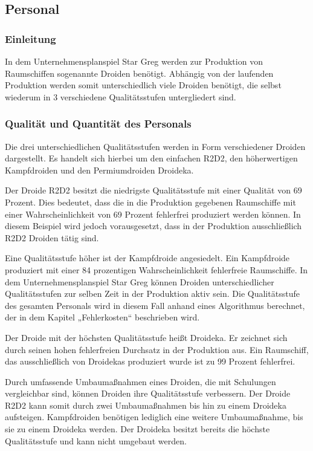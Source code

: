 \subsection{Personal}
\label{sub:Personal}
\subsubsection{Einleitung}
In dem Unternehmensplanspiel Star Greg werden zur Produktion von Raumschiffen sogenannte Droiden benötigt.   Abhängig von der laufenden Produktion  werden somit unterschiedlich viele Droiden benötigt, die selbst wiederum in 3 verschiedene Qualitätsstufen untergliedert sind.

\subsubsection{Qualität und Quantität des Personals}
Die drei unterschiedlichen Qualitätsstufen werden in Form verschiedener Droiden dargestellt. Es handelt sich hierbei um den einfachen R2D2, den höherwertigen Kampfdroiden und den Permiumdroiden Droideka.

Der Droide R2D2 besitzt die niedrigste Qualitätsstufe mit einer Qualität von 69 Prozent. Dies bedeutet, dass die in die Produktion gegebenen Raumschiffe mit einer Wahrscheinlichkeit von 69 Prozent fehlerfrei produziert werden können. In diesem Beispiel wird  jedoch vorausgesetzt, dass in der Produktion ausschließlich R2D2 Droiden tätig sind.  

Eine Qualitätsstufe höher ist der Kampfdroide angesiedelt. Ein Kampfdroide produziert mit einer 84 prozentigen Wahrscheinlichkeit fehlerfreie Raumschiffe. In dem Unternehmensplanspiel Star Greg können Droiden unterschiedlicher Qualitätsstufen zur selben Zeit in der Produktion aktiv sein. Die Qualitätsstufe des gesamten Personals wird in diesem Fall anhand eines Algorithmus berechnet, der in dem Kapitel „Fehlerkosten“ beschrieben wird.

Der Droide mit der höchsten Qualitätsstufe heißt Droideka. Er zeichnet sich durch seinen hohen fehlerfreien Durchsatz in der Produktion aus. Ein Raumschiff, das ausschließlich von Droidekas produziert wurde ist zu 99 Prozent fehlerfrei. 

Durch umfassende Umbaumaßnahmen eines Droiden, die mit Schulungen vergleichbar sind, können Droiden ihre Qualitätsstufe verbessern. Der Droide R2D2 kann somit durch zwei Umbaumaßnahmen bis hin zu einem Droideka aufsteigen.  Kampfdroiden benötigen lediglich eine weitere Umbaumaßnahme, bis sie zu einem Droideka werden. Der Droideka besitzt bereits die höchste Qualitätsstufe und kann nicht umgebaut werden.


